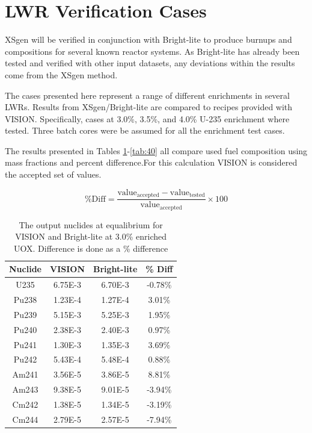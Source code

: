 \documentclass{article}
\begin{document}
\section{LWR Verification Cases}

XSgen will be verified in conjunction with Bright-lite to produce burnups and
compositions for several known reactor systems. As Bright-lite has already been tested
and verified with other input datasets\cite{brightlite},
any deviations within the results come from the XSgen method.

The cases presented here represent a range of different enrichments in several LWRs.
Results from XSgen/Bright-lite are compared to recipes provided with VISION\cite{vision}.
Specifically, cases at 3.0\%, 3.5\%, and 4.0\% U-235 enrichment where tested.
Three batch cores were be assumed for all the enrichment test cases.

The results presented in Tables \ref{tab:30}-\ref{tab:40}
all compare used fuel composition using mass fractions and percent difference.For this 
calculation VISION is considered the accepted set of values. 
 
\begin{equation}
\label{percentdiff}
\%\mathrm{ Diff} = \mathrm{\frac{value_{accepted} - value_{tested}}{value_{accepted}}\times100}
\end{equation}

\begin{table}[!htb]
\centering
\small
\caption{The output nuclides at equalibrium for VISION and Bright-lite at 3.0\% enriched UOX. Difference is done as a \% difference}
\label{tab:30}
\vspace{0.5em}
\begin{tabular}{cccc}
Nuclide &  VISION & Bright-lite & \% Diff \\
\hline
U235  & 6.75E-3 & 6.70E-3 & -0.78\%\\
Pu238 & 1.23E-4 & 1.27E-4 & 3.01\%\\
Pu239 & 5.15E-3 & 5.25E-3 & 1.95\%\\
Pu240 & 2.38E-3 & 2.40E-3 & 0.97\%\\
Pu241 & 1.30E-3 & 1.35E-3 & 3.69\%\\
Pu242 & 5.43E-4 & 5.48E-4 & 0.88\%\\
Am241 & 3.56E-5 & 3.86E-5 & 8.81\%\\
Am243 & 9.38E-5 & 9.01E-5 & -3.94\%\\
Cm242 & 1.38E-5 & 1.34E-5 & -3.19\%\\
Cm244 & 2.79E-5 & 2.57E-5 & -7.94\%\\
\end{tabular}
\end{table}
\end{document}
